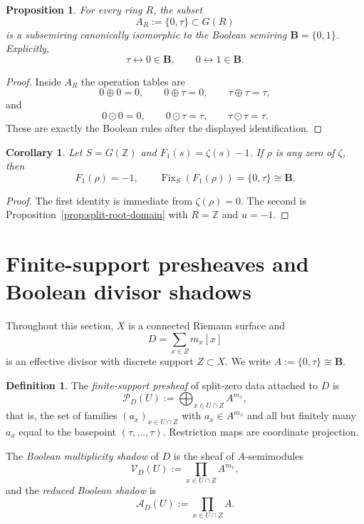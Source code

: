 \documentclass[11pt,a4paper]{article}
\newtheorem{proposition}[theorem]{Proposition}
\newtheorem{corollary}[theorem]{Corollary}
\theoremstyle{definition}
\newtheorem{definition}[theorem]{Definition}
\theoremstyle{remark}
\DeclareMathOperator{\Fix}{Fix}
\newcommand{\ZZ}{\mathbb Z}
\newcommand{\BB}{\mathbf B}
\newcommand{\cP}{\mathcal P}
\newcommand{\cV}{\mathcal V}
\newcommand{\cA}{\mathcal A}
\newcommand{\taup}{\tau}
\begin{document}
\begin{proposition}\label{prop:boolean-pair}
For every ring $R$, the subset
\[
A_R:=\{0,\taup\}\subset G(R)
\]
is a subsemiring canonically isomorphic to the Boolean semiring $\BB=\{0,1\}$.  Explicitly,
\[
\taup\longleftrightarrow 0\in\BB,
\qquad
0\longleftrightarrow 1\in\BB.
\]
\end{proposition}

\begin{proof}
Inside $A_R$ the operation tables are
\[
0\oplus0=0,\qquad 0\oplus\taup=0,\qquad \taup\oplus\taup=\taup,
\]
and
\[
0\odot0=0,\qquad 0\odot\taup=\taup,\qquad \taup\odot\taup=\taup.
\]
These are exactly the Boolean rules after the displayed identification.
\end{proof}

\begin{corollary}\label{cor:zeta-pointwise}
Let $S=G(\ZZ)$ and $F_1(s)=\zeta(s)-1$.  If $\rho$ is any zero of $\zeta$, then
\[
F_1(\rho)=-1,
\qquad
\Fix_S(F_1(\rho))=\{0,\taup\}\cong\BB.
\]
\end{corollary}

\begin{proof}
The first identity is immediate from $\zeta(\rho)=0$.  The second is Proposition~\ref{prop:split-root-domain} with $R=\ZZ$ and $u=-1$.
\end{proof}

\section{Finite-support presheaves and Boolean divisor shadows}

Throughout this section, $X$ is a connected Riemann surface and
\[
D=\sum_{x\in Z}m_x[x]
\]
is an effective divisor with discrete support $Z\subset X$.  We write $A:=\{0,\taup\}\cong\BB$.

\begin{definition}
The \emph{finite-support presheaf} of split-zero data attached to $D$ is
\[
\cP_D(U):=\bigoplus_{x\in U\cap Z}A^{m_x},
\]
that is, the set of families $(a_x)_{x\in U\cap Z}$ with $a_x\in A^{m_x}$ and all but finitely many $a_x$ equal to the basepoint $(\taup,\dots,\taup)$.  Restriction maps are coordinate projection.

The \emph{Boolean multiplicity shadow} of $D$ is the sheaf of $A$-semimodules
\[
\cV_D(U):=\prod_{x\in U\cap Z}A^{m_x},
\]
and the \emph{reduced Boolean shadow} is
\[
\cA_D(U):=\prod_{x\in U\cap Z}A.
\]
\end{definition}
\end{document}
